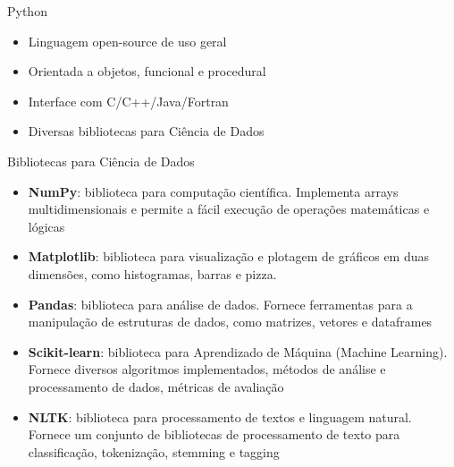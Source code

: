 \begin{frame}[t, fragile]{Python}
  \begin{itemize}
    \item Linguagem open-source de uso geral
    \item Orientada a objetos, funcional e procedural
    \item Interface com C/C++/Java/Fortran
    \item Diversas bibliotecas para Ciência de Dados
  \end{itemize}
\end{frame}
%
\begin{frame}{Bibliotecas para Ciência de Dados}
  \begin{itemize}
    \item {\bf NumPy}: biblioteca para computação científica. Implementa arrays multidimensionais e permite a fácil execução de operações matemáticas e lógicas
    \item {\bf Matplotlib}: biblioteca para visualização e plotagem de gráficos em duas dimensões, como histogramas, barras e pizza.
    \item {\bf Pandas}: biblioteca para análise de dados. Fornece ferramentas para a manipulação de estruturas de dados, como matrizes, vetores e dataframes
    \item {\bf Scikit-learn}: biblioteca para Aprendizado de Máquina (Machine Learning). Fornece diversos algoritmos implementados, métodos de análise e processamento de dados, métricas de avaliação
    \item {\bf NLTK}: biblioteca para processamento de textos e linguagem natural. Fornece um conjunto de bibliotecas de processamento de texto para classificação, tokenização, stemming e tagging 
  \end{itemize}
\end{frame}
%

 